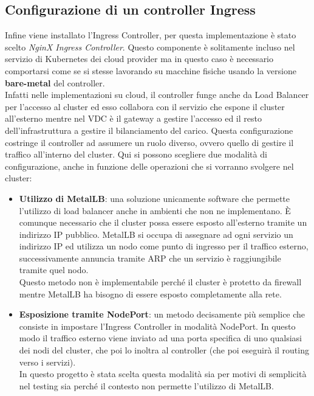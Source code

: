 \documentclass[12pt,a4paper,openright,twoside]{book}
\begin{document}
\subsection{Configurazione di un controller Ingress}
\label{sec:ingress}
Infine viene installato l'Ingress Controller, per questa implementazione è stato scelto \textit{NginX Ingress Controller}. Questo componente è solitamente
incluso nel servizio di Kubernetes dei cloud provider ma in questo caso è necessario comportarsi come se si stesse lavorando su macchine fisiche usando la 
versione \textbf{bare-metal} del controller.\\
Infatti nelle implementazioni su cloud, il controller funge anche da Load Balancer per l'accesso al cluster ed esso collabora con il servizio che espone il cluster all'esterno
mentre nel VDC è il gateway a gestire l'accesso ed il resto dell'infrastruttura a gestire il bilanciamento del carico. Questa configurazione costringe il controller ad assumere 
un ruolo diverso, ovvero quello di gestire il traffico all'interno del cluster.
Qui si possono scegliere due modalità di configurazione, anche in funzione delle operazioni che si vorranno svolgere nel cluster\cite{nginx-ingress-controller}:
\begin{itemize}
    \item \textbf{Utilizzo di MetalLB}: una soluzione unicamente software che permette l'utilizzo di load balancer anche in ambienti che non ne implementano.
        È comunque necessario che il cluster possa essere esposto all'esterno tramite un indirizzo IP pubblico. MetalLB si occupa di assegnare ad ogni servizio un
        indirizzo IP ed utilizza un nodo come punto di ingresso per il traffico esterno, successivamente annuncia tramite ARP che un servizio è raggiungibile tramite 
        quel nodo\cite{metallb}.\\
        Questo metodo non è implementabile perché il cluster è protetto da firewall mentre MetalLB ha bisogno di essere esposto completamente alla rete.
    \item {\textbf{Esposizione tramite NodePort}: un metodo decisamente più semplice che consiste in impostare l'Ingress Controller in modalità NodePort.
        In questo modo il traffico esterno viene inviato ad una porta specifica di uno qualsiasi dei nodi del cluster, che poi lo inoltra al controller (che poi
        eseguirà il routing verso i servizi).\\
        In questo progetto è stata scelta questa modalità sia per motivi di semplicità nel testing sia perché il contesto non permette l'utilizzo di MetalLB.
    }
\end{itemize}
\end{document}
